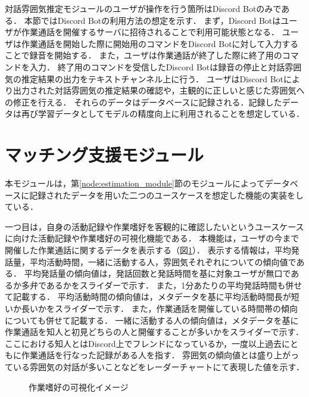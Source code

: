 対話雰囲気推定モジュールのユーザが操作を行う箇所はDiscord Botのみである．
本節ではDiscord Botの利用方法の想定を示す．
まず，Discord Botはユーザが作業通話を開催するサーバに招待されることで利用可能状態となる．
ユーザは作業通話を開始した際に開始用のコマンドをDiscord Botに対して入力することで録音を開始する．
また，ユーザは作業通話が終了した際に終了用のコマンドを入力．
終了用のコマンドを受信したDiscord Botは録音の停止と対話雰囲気の推定結果の出力をテキストチャンネル上に行う．
ユーザはDiscord Botにより出力された対話雰囲気の推定結果の確認や，主観的に正しいと感じた雰囲気への修正を行える．
それらのデータはデータベースに記録される．記録したデータは再び学習データとしてモデルの精度向上に利用されることを想定している．

\section{マッチング支援モジュール}

本モジュールは，第\ref{node:estimation_module}節のモジュールによってデータベースに記録されたデータを用いた二つのユースケースを想定した機能の実装をしている．

一つ目は，自身の活動記録や作業嗜好を客観的に確認したいというユースケースに向けた活動記録や作業嗜好の可視化機能である．
本機能は，ユーザの今まで開催した作業通話に関するデータを表示する（図\ref{fig:estimationgraph}）．
表示する情報は，平均発話量，平均活動時間，一緒に活動する人，雰囲気それぞれについての傾向値である．
平均発話量の傾向値は，発話回数と発話時間を基に対象ユーザが無口であるか多弁であるかをスライダーで示す．
また，1分あたりの平均発話時間も併せて記載する．
平均活動時間の傾向値は，メタデータを基に平均活動時間長が短いか長いかをスライダーで示す．
また，作業通話を開催している時間帯の傾向についても併せて記載する．
一緒に活動する人の傾向値は，メタデータを基に作業通話を知人と初見どちらの人と開催することが多いかをスライダーで示す．
ここにおける知人とはDiscord上でフレンドになっているか，一度以上過去にともに作業通話を行なった記録がある人を指す．
雰囲気の傾向値とは盛り上がっている雰囲気の対話が多いことなどをレーダーチャートにて表現した値を示す．

\begin{figure}
    \centering
    \caption{作業嗜好の可視化イメージ}
    \label{fig:estimationgraph}
\end{figure}

